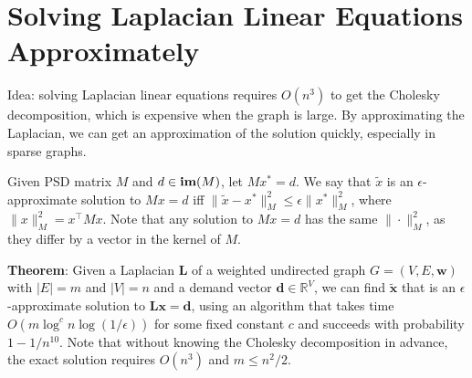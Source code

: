\section{Solving Laplacian Linear Equations Approximately}

Idea: solving Laplacian linear equations requires $O(n^3)$ to get the Cholesky decomposition, which is expensive when the graph is large. By approximating the Laplacian, we can get an approximation of the solution quickly, especially in sparse graphs.

Given PSD matrix $M$ and $d \in \operatorname{\textbf{im}}(M)$, let $M x^* = d$. We say that $\tilde{x}$ is an $\epsilon$-approximate solution to $Mx=d$ iff $\|\tilde{x} - x^*\|_M^2 \le \epsilon \|x^*\|_M^2$, where $\|x\|_M^2 = x^\top M x$. Note that any solution to $M x = d$ has the same $\|\cdot\|_M^2$, as they differ by a vector in the kernel of $M$.

\textbf{Theorem}: Given a Laplacian $\boldsymbol{L}$ of a weighted undirected graph $G=(V, E, \boldsymbol{w})$ with $|E|=m$ and $|V|=n$ and a demand vector $\boldsymbol{d} \in \mathbb{R}^{V}$, we can find $\tilde{\boldsymbol{x}}$ that is an $\epsilon$-approximate solution to $\boldsymbol{L x}=\boldsymbol{d}$, using an algorithm that takes time $O\left(m \log ^{c} n \log (1 / \epsilon)\right)$ for some fixed constant $c$ and succeeds with probability $1-1 / n^{10}$. Note that without knowing the Cholesky decomposition in advance, the exact solution requires $O(n^3)$ and $m \le n^2 / 2$.
